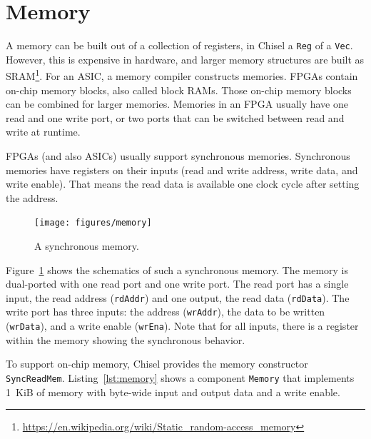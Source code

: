 \documentclass[%
    10pt,
    headinclude, footexclude,
    openright, %
    notitlepage,
    cleardoubleempty,
    headsepline,
    pointlessnumbers,
    bibtotoc, idxtotoc,
    ]{scrbook}
\newcommand{\code}[1]{{\lstinline[basicstyle=\small\ttfamily]{#1}}}
\newcommand{\myref}[2]{\href{#1}{#2}}
\renewcommand{\myref}[2]{{#2}{\footnote{\url{#1}}}}
\begin{document}
\section{Memory}

A memory can be built out of a collection of registers, in Chisel a \code{Reg} of a \code{Vec}.
However, this is expensive in hardware, and larger memory structures are built
as \myref{https://en.wikipedia.org/wiki/Static_random-access_memory}{SRAM}.
For an ASIC, a memory compiler constructs memories.
FPGAs contain on-chip memory blocks, also called block RAMs.
Those on-chip memory blocks can be combined for larger memories.
Memories in an FPGA usually have one read and one write port, or
two ports that can be switched between read and write at runtime.

FPGAs (and also ASICs) usually support synchronous memories.
Synchronous memories have registers on their inputs (read and write address, write data,
and write enable). That means the read data is available one clock
cycle after setting the address.

\begin{figure}
  \centering
  \texttt{[image: figures/memory]}
  \caption{A synchronous memory.}
  \label{fig:memory}
\end{figure}

Figure~\ref{fig:memory} shows the schematics of such a synchronous memory.
The memory is dual-ported with one read port and one write port.
The read port has a single input, the read address (\code{rdAddr}) and
one output, the read data (\code{rdData}).
The write port has three inputs: the address (\code{wrAddr}), the data
to be written (\code{wrData}), and a write enable (\code{wrEna}).
Note that for all inputs, there is a register within the memory showing the
synchronous behavior.

To support on-chip memory, Chisel provides the memory constructor \code{SyncReadMem}.
Listing~\ref{lst:memory} shows a component \code{Memory} that implements
1~KiB of memory with byte-wide input and output data and a write enable.

\end{document}
